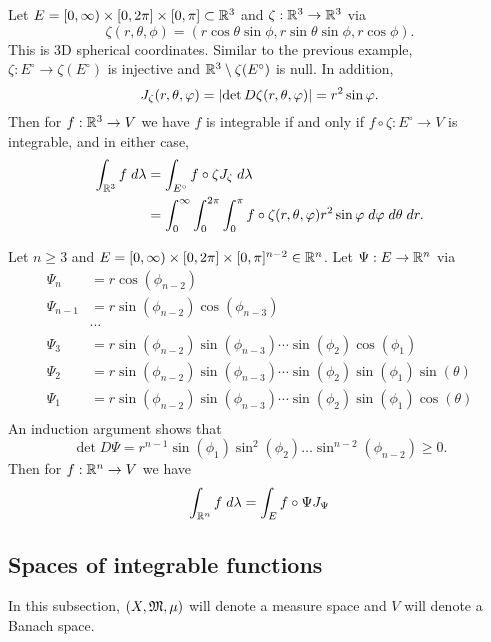 \documentclass[a4paper]{article}
\begin{document}
\begin{eg}
Let $E = [0, \infty) \times [0, 2 \pi] \times [0, \pi] \subset
\mathbb{R}^3$ and $\zeta : \mathbb{R}^3 \to \mathbb{R}^3$ via 
\[
\zeta(r, \theta, \phi) = (r \cos \theta \sin \phi, 
r \sin \theta \sin \phi, r \cos \phi).
\]
This is 3D spherical coordinates. Similar to the previous 
example, $\zeta: E^\circ \to \zeta(E^\circ)$ is injective 
and $\mathbb{R}^3 \setminus \zeta(E^\circ)$ is null. 
In addition, 
\[
J_{\zeta}(r, \theta, \varphi) = 
\left\lvert \det D \zeta (r, \theta, \varphi)\right\rvert = r^2 \sin \varphi.
\]
Then for $f : \mathbb{R}^3 \to V$ we have $f$ is integrable if and 
only if $f \circ \zeta : E^\circ \to V$ is integrable,
and in either case, 
\[
\begin{aligned}
\int_{\mathbb{R}^3} f \; d \lambda 
&= \int_{E^\circ} f \circ \zeta J_{\zeta} \; d \lambda \\
&= \int_0^\infty \int_0^{2\pi} \int_0^\pi 
f \circ \zeta(r, \theta, \varphi) r^2 \sin \varphi \; d \varphi \; d \theta
\; d r.
\end{aligned}
\]
\end{eg}

\begin{eg}
Let $n \geq 3$ and $E = [0, \infty) \times [0, 2 \pi] 
\times [0, \pi]^{n-2} \in \mathbb{R}^n$. Let $\Psi: E \to \mathbb{R}^n$ 
via 
\[
\begin{aligned}
\Psi_n &= r \cos (\phi_{n-2}) \\
\Psi_{n-1} &= r \sin (\phi_{n-2}) \cos (\phi_{n-3}) \\
&\cdots \\
\Psi_3 &= r \sin (\phi_{n-2}) \sin (\phi_{n-3}) \cdots \sin (\phi_2) 
\cos (\phi_1) \\
\Psi_2 &= r \sin (\phi_{n-2}) \sin (\phi_{n-3}) \cdots \sin (\phi_2) 
\sin (\phi_1) \sin (\theta) \\
\Psi_1 &= r \sin (\phi_{n-2}) \sin (\phi_{n-3}) \cdots \sin (\phi_2) 
\sin (\phi_1) \cos (\theta) \\
\end{aligned}
\]
An induction argument shows that 
\[
\det D\Psi = r^{n-1} \sin (\phi_1) \sin^2 (\phi_2) 
\dots \sin^{n-2} (\phi_{n-2}) \geq 0.
\]
Then for $f : \mathbb{R}^n \to V$ we have 
\[
\int_{\mathbb{R}^n} f \; d \lambda = \int_E f \circ \Psi J_{\Psi}
\]
\end{eg}

\subsection{Spaces of integrable functions}

In this subsection, $(X, \mathfrak{M}, \mu)$ will denote a measure
space and $V$ will denote a Banach space.
\end{document}
